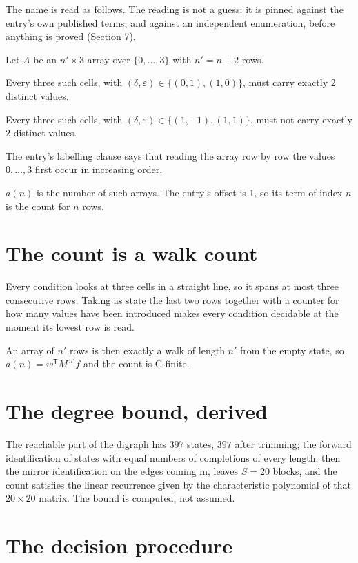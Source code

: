\documentclass[11pt]{article}
\theoremstyle{definition}
\begin{document}
The name is read as follows. The reading is not a guess: it is pinned against the entry's own published terms, and against an independent enumeration, before anything is proved (Section 7).

Let $A$ be an $n' \times 3$ array over $\{0,\dots,3\}$ with $n' = n + 2$ rows.

Every three such cells, with $(\delta,\varepsilon) \in \{(0,1), (1,0)\}$, must carry exactly $2$ distinct values.

Every three such cells, with $(\delta,\varepsilon) \in \{(1,-1), (1,1)\}$, must not carry exactly $2$ distinct values.

The entry's labelling clause says that reading the array row by row the values $0,\dots,3$ first occur in increasing order.

$a(n)$ is the number of such arrays. The entry's offset is 1, so its term of index $n$ is the count for $n$ rows.

\section{The count is a walk count}

Every condition looks at three cells in a straight line, so it spans at most three consecutive rows. Taking as state the last two rows together with a counter for how many values have been introduced makes every condition decidable at the moment its lowest row is read.

An array of $n'$ rows is then exactly a walk of length $n'$ from the empty state, so $a(n) = w^{\mathsf T}M^{\,n'}f$ and the count is C-finite.

\section{The degree bound, derived}

The reachable part of the digraph has $397$ states, $397$ after trimming; the forward identification of states with equal numbers of completions of every length, then the mirror identification on the edges coming in, leaves $S = 20$ blocks, and the count satisfies the linear recurrence given by the characteristic polynomial of that $20\times20$ matrix. The bound is computed, not assumed.

\section{The decision procedure}
\end{document}
